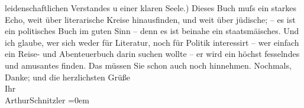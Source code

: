 \begin{ledgroupsized}[t]{13cm}
               leidenschaftlichen Verstandes u einer klaren Seele.) Dieses Buch muſs ein starkes
               Echo, weit über literarische Kreise hinausfinden, und weit über jüdische; – es ist
               ein politisches Buch im guten Sinn – denn es ist beinahe ein staatsmä{\geminationn}isches. Und ich glaube, wer sich weder für Literatur,
               noch {\pb}für Politik interessirt – wer einfach
               ein Reise- und Abenteuerbuch darin \strikeout{\textcolor{gray}{finden}} suchen wollte – er wird ein höchst fesselndes und amusantes  finden. Das müssen Sie schon auch noch hinnehmen. \pend
           \pstart
           Nochmals, Danke; und die herzlichsten Grüße {\\[\baselineskip]}Ihr {\\[\baselineskip]}\spacefill\mbox{ArthurSchnitzler}\pend
           \leftskip=0em{}
         
         \endnumbering{}\end{ledgroupsized}\begin{anhang}\end{anhang}\newcommand{\dateiname}{L03021}\newcommand{\titel}{Arthur Schnitzler an Felix Salten, 6. 5. 1925}\newcommand{\editorInnen}{Martin Anton Müller und Laura Untner}
      